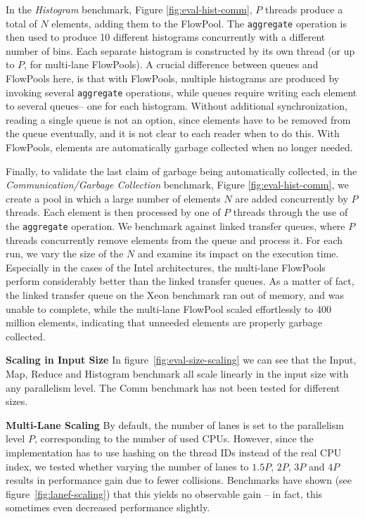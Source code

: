 \documentclass[runningheads,a4paper,fleqn]{llncs}
\begin{document}
In the \textit{Histogram} benchmark, Figure \ref{fig:eval-hist-comm},
$P$ threads produce a total of $N$ elements, adding them to the
FlowPool. The \verb=aggregate= operation is then used to produce 10
different histograms concurrently with a different number of bins. 
Each separate histogram is constructed by its own thread (or up to
$P$, for multi-lane FlowPools).
A crucial difference between queues and FlowPools here, is that with 
FlowPools, multiple histograms are produced 
by invoking several \verb=aggregate= operations, while queues require
writing each element to several queues-- one for each histogram.
Without additional synchronization, reading a single queue is not an
option, since elements have to be removed from the queue eventually, and
it is not clear to each reader when to do this.
With FlowPools, elements are automatically garbage collected when no
longer needed.

Finally, to validate the last claim of garbage being automatically
collected, in the \textit{Communication/Garbage Collection} benchmark, 
Figure \ref{fig:eval-hist-comm}, we create a pool in which a
large number of elements $N$ are added concurrently by $P$
threads. Each element is then processed by one of $P$ threads through
the use of the \verb=aggregate= operation.
We benchmark against linked transfer queues, where $P$ threads concurrently remove
elements from the queue and process it.
For each run, we vary the size of the $N$ and examine its impact on the execution time.
Especially in the cases of the Intel architectures, the multi-lane 
FlowPools perform considerably better than the linked transfer queues. 
As a matter of fact, the linked transfer queue on the Xeon benchmark ran out of 
memory, and was unable to complete, while the multi-lane FlowPool scaled effortlessly 
to 400 million elements, indicating that unneeded elements are properly garbage collected.

\textbf{Scaling in Input Size} In figure~\ref{fig:eval-size-scaling}
we can see that the Input, Map, Reduce and Histogram benchmark all
scale linearly in the input size with any parallelism level. The Comm
benchmark has not been tested for different sizes. 

\textbf{Multi-Lane Scaling} By default, the number of lanes is set to
the parallelism level $P$, corresponding to the number of used
CPUs. However, since the implementation has to use hashing on the
thread IDs instead of the real CPU index, we tested whether varying
the number of lanes to $1.5 P$, $2P$, $3P$ and $4P$ results in
performance gain due to fewer collisions. Benchmarks have shown (see
figure~\ref{fig:lanef-scaling}) that this yields no observable gain --
in fact, this sometimes even decreased performance slightly.
\end{document}
